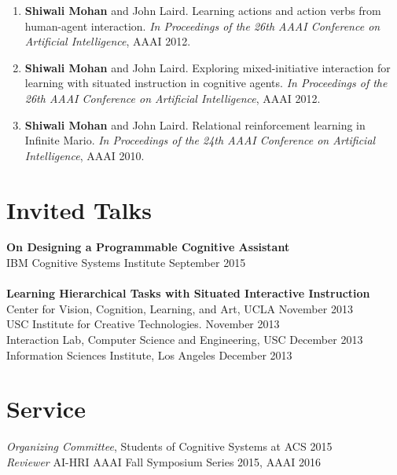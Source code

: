 \documentclass[margin,line,11pt]{res}
\begin{document}
\begin{resume}
\begin{enumerate}[label=\lbrack A\arabic*\rbrack,leftmargin=*]
                  \item \textbf{Shiwali Mohan} and John Laird. Learning actions and action verbs from human-agent interaction. \emph{In
                    Proceedings of the 26th AAAI Conference on Artificial Intelligence}, AAAI 2012.

                  \item \textbf{Shiwali Mohan} and John Laird. Exploring mixed-initiative interaction for learning with situated instruction in cognitive agents. \emph{In Proceedings of the 26th AAAI Conference on Artificial Intelligence}, AAAI 2012.

                  \item \textbf{Shiwali Mohan} and John Laird. Relational reinforcement learning in Infinite Mario. \emph{In Proceedings of the
                    24th AAAI Conference on Artificial Intelligence}, AAAI 2010.
                  \end{enumerate}

                  \section{\sc Invited Talks}
                  \textbf{On Designing a Programmable Cognitive Assistant}\\
                  IBM Cognitive Systems Institute \hfill September 2015 \\
                  \\
                  \textbf{Learning Hierarchical Tasks with Situated Interactive Instruction}\\
                  Center for Vision, Cognition, Learning, and Art, UCLA \hfill November 2013\\
                  USC Institute for Creative Technologies. \hfill November 2013\\
                  Interaction Lab, Computer Science and Engineering, USC \hfill December 2013\\
                  Information Sciences Institute, Los Angeles \hfill December 2013

                  \section{\sc Service}
                  \emph{Organizing Committee}, Students of Cognitive Systems at ACS \hfill 2015\\
                  \emph{Reviewer} AI-HRI AAAI Fall Symposium Series 2015, AAAI 2016



\end{resume}
\end{document}
